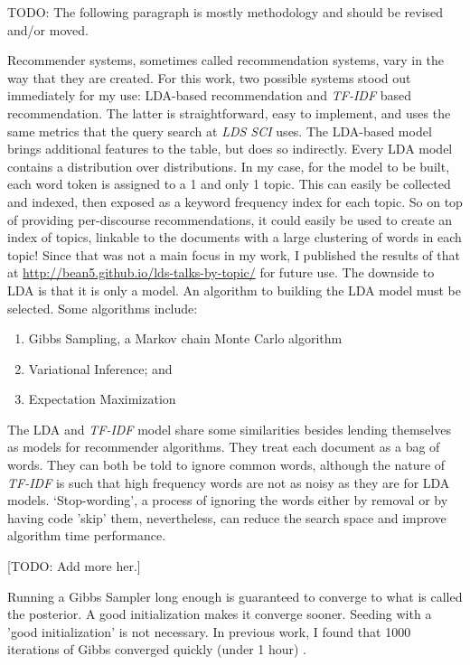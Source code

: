 TODO: The following paragraph is mostly methodology and should be revised and/or moved.

Recommender systems, sometimes called recommendation systems, vary in the way that they are created. For this work, two possible systems stood out immediately for my use: LDA-based recommendation and \emph{TF-IDF} based recommendation. The latter is straightforward, easy to implement, and uses the same metrics that the query search at \emph{LDS SCI} uses. The LDA-based model brings additional features to the table, but does so indirectly. Every LDA model contains a distribution over distributions. In my case, for the model to be built, each word token is assigned to a 1 and only 1 topic. This can easily be collected and indexed, then exposed as a keyword frequency index for each topic. So on top of providing per-discourse recommendations, it could easily be used to create an index of topics, linkable to the documents with a large clustering of words in each topic! Since that was not a main focus in my work, I published the results of that at \url{http://bean5.github.io/lds-talks-by-topic/} for future use. The downside to LDA is that it is only a model. An algorithm to building the LDA model must be selected. Some algorithms include:

\begin{enumerate}
  \item Gibbs Sampling, a Markov chain Monte Carlo algorithm
  \item Variational Inference; and
  \item Expectation Maximization
\end{enumerate}

The LDA and \emph{TF-IDF} model share some similarities besides lending themselves as models for recommender algorithms. They treat each document as a bag of words. They can both be told to ignore common words, although the nature of \emph{TF-IDF} is such that high frequency words are not as noisy as they are for LDA models. `Stop-wording', a process of ignoring the words either by removal or by having code 'skip' them, nevertheless, can reduce the search space and improve algorithm time performance.

[TODO: Add more her.]

Running a Gibbs Sampler long enough is guaranteed to converge to what is called the posterior. A good initialization makes it converge sooner. Seeding with a 'good initialization' is not necessary. In previous work, I found that 1000 iterations of Gibbs converged quickly (under 1 hour) \citep{bean5-LDA-ToT}.

